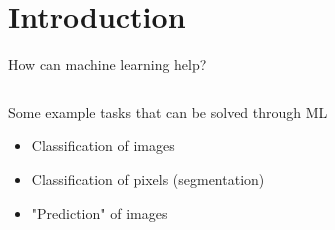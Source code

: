 \documentclass[9pt, aspectratio=169]{beamer}
\begin{document}
\section{Introduction}

\begin{frame}
    {How can machine learning help?}
    \begin{columns}
        \begin{column}{.4\textwidth}
            Some example tasks that can be solved through ML
            \begin{itemize}[<+->]
                \item Classification of images
                \item Classification of pixels (segmentation)
                \item "Prediction" of images
            \end{itemize}
        \end{column}
        \begin{column}{.6\textwidth}
\end{column}
\end{columns}
\end{frame}
\end{document}
